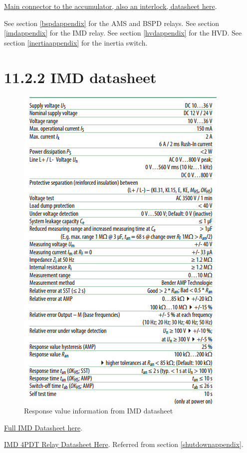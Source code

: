 \documentclass{article}
\begin{document}
\href{http://www.mouser.com/pdfdocs/9876510101.PDF}{Main connector to the accumulator, also an interlock, datasheet here}.

See section \ref{bspdappendix} for the AMS and BSPD relays.
See section \ref{imdappendix} for the IMD relay.
See section \ref{hvdappendix} for the HVD.
See section \ref{inertiaappendix} for the inertia switch.

\section*{11.2.2 IMD datasheet} \label{imdappendix}
\begin{figure}[H]
    \centering
    \includegraphics[width=0.4 \textheight]{IMD_datasheet_snip}
    \caption{Response value information from IMD datasheet}
    \label{IMDresponsetime}
\end{figure}

\href{http://www.bender.org/documents/IR155-10_datasheet_NAE1012821.pdf}{Full IMD Datasheet here}.

\href{http://www.automationdirect.com/static/specs/78relays.pdf}{IMD 4PDT Relay Datasheet Here}. Referred from section \ref{shutdownappendix}.
\end{document}
